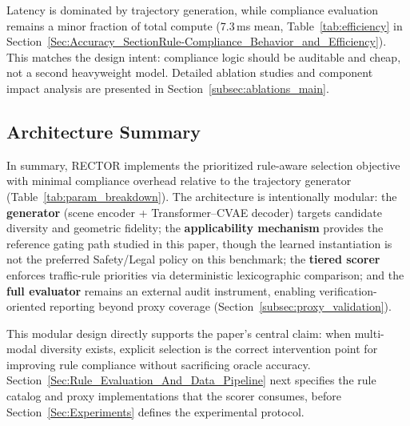 \noindent
Latency is dominated by trajectory generation, while compliance evaluation remains a minor fraction of total compute (7.3\,ms mean, Table~\ref{tab:efficiency} in Section~\ref{Sec:Accuracy_SectionRule-Compliance_Behavior_and_Efficiency}). This matches the design intent: compliance logic should be auditable and cheap, not a second heavyweight model.  Detailed ablation studies and component impact analysis are presented in Section~\ref{subsec:ablations_main}.

\subsection{Architecture Summary}
\label{subsec:architecture_summary}

In summary, RECTOR implements the prioritized rule-aware selection objective with minimal compliance overhead relative to the trajectory generator (Table~\ref{tab:param_breakdown}).  The architecture is intentionally modular: the \textbf{generator} (scene encoder + Transformer--CVAE decoder) targets candidate diversity and geometric fidelity; the \textbf{applicability mechanism} provides the reference gating path studied in this paper, though the learned instantiation is not the preferred Safety/Legal policy on this benchmark; the \textbf{tiered scorer} enforces traffic-rule priorities via deterministic lexicographic comparison; and the \textbf{full evaluator} remains an external audit instrument, enabling verification-oriented reporting beyond proxy coverage (Section~\ref{subsec:proxy_validation}).

This modular design directly supports the paper's central claim: when multi-modal diversity exists, explicit selection is the correct intervention point for improving rule compliance without sacrificing oracle accuracy. Section~\ref{Sec:Rule_Evaluation_And_Data_Pipeline} next specifies the rule catalog and proxy implementations that the scorer consumes, before Section~\ref{Sec:Experiments} defines the experimental protocol.